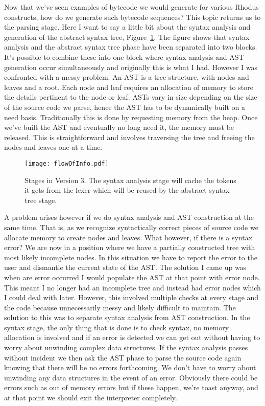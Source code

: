 Now that we've seen examples of bytecode we would generate for various Rhodus constructs, how do we generate such bytecode sequences? This topic returns us to the parsing stage. Here I want to say a little bit about the syntax analysis and generation of the abstract syntax tree, Figure~\ref{fig:Syntax_AST_Interaction}. The figure shows that syntax analysis and the abstract syntax tree phase have been separated into two blocks. It's possible to combine these into one block where syntax analysis and AST generation occur simultaneously and originally this is what I had. However I was confronted with a messy problem. An AST is a tree structure, with nodes and leaves and a root. Each node and leaf requires an allocation of memory to store the details pertinent to the node or leaf. ASTs vary in size depending on the size of the source code we parse, hence the AST has to be dynamically built on a need basis. Traditionally this is done by requesting memory from the heap. Once we've built the AST and eventually no long need it, the memory must be released. This is straightforward and involves traversing the tree and freeing the nodes and leaves one at a time.

\begin{figure}[htpb]
\centering
\texttt{[image: flowOfInfo.pdf]}
\caption{Stages in Version 3. The syntax analysis stage will cache the tokens it gets from the lexer which will be reused by the abstract syntax tree stage. }
\label{fig:Syntax_AST_Interaction}
\end{figure}

A problem arises however if we do syntax analysis and AST construction at the same time. That is, as we recognize syntactically correct pieces of source code we allocate memory to create nodes and leaves. What however, if there is a syntax error? We are now in a position where we have a partially constructed tree with most likely incomplete nodes. In this situation we have to report the error to the user and dismantle the current state of the AST. The solution I came up was  when are error occurred I would populate the AST at that point with error node. This meant I no longer had an incomplete tree and instead had error nodes which I could deal with later. However, this involved multiple checks at every stage and the code because unnecessarily messy and likely difficult to maintain. The solution to this was to separate syntax analysis from AST construction. In the syntax stage, the only thing that is done is to check syntax, no memory allocation is involved and if an error is detected we can get out without having to worry about unwinding complex data structures. If the syntax analysis passes without incident we then ask the AST phase to parse the source code again knowing that there will be no errors forthcoming. We don't have to worry about unwinding any data structures in the event of an error. Obviously there could be errors such as out of memory errors but if these happen, we're toast anyway, and at that point we should exit the interpreter completely.

